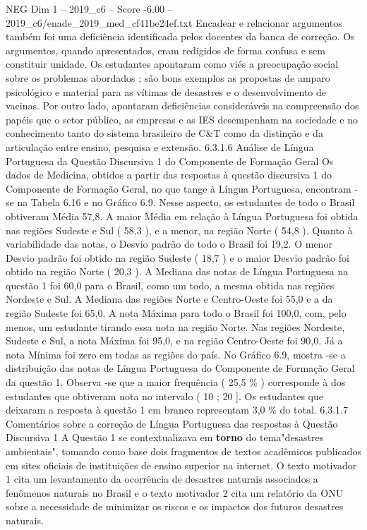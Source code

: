 \begin{textsample}{NEG Dim 1 – 2019\_c6 – Score -6.00 – 2019\_c6/enade\_2019\_med\_cf41be24ef.txt}
Encadear e relacionar argumentos também foi uma deficiência identificada pelos docentes da banca de correção.
Os argumentos, quando apresentados, eram redigidos de forma confusa e sem constituir unidade.
Os estudantes apontaram como viés a preocupação social sobre os problemas abordados ; são bons exemplos as propostas de amparo psicológico e material para as vítimas de desastres e o desenvolvimento de vacinas.
Por outro lado, apontaram deficiências consideráveis na compreensão dos papéis que o setor público, as empresas e as IES desempenham na sociedade e no conhecimento tanto do sistema brasileiro de C\&T como da distinção e da articulação entre ensino, pesquisa e extensão. 6.3.1.6 Análise de Língua Portuguesa da Questão Discursiva 1 do Componente de Formação Geral Os dados de Medicina, obtidos a partir das respostas à questão discursiva 1 do Componente de Formação Geral, no que tange à Língua Portuguesa, encontram -se na Tabela 6.16 e no Gráfico 6.9.
Nesse aspecto, os estudantes de todo o Brasil obtiveram Média 57,8.
A maior Média em relação à Língua Portuguesa foi obtida nas regiões Sudeste e Sul ( 58,3 ), e a menor, na região Norte ( 54,8 ).
Quanto à variabilidade das notas, o Desvio padrão de todo o Brasil foi 19,2.
O menor Desvio padrão foi obtido na região Sudeste ( 18,7 ) e o maior Desvio padrão foi obtido na região Norte ( 20,3 ).
A Mediana das notas de Língua Portuguesa na questão 1 foi 60,0 para o Brasil, como um todo, a mesma obtida nas regiões Nordeste e Sul.
A Mediana das regiões Norte e Centro-Oeste foi 55,0 e a da região Sudeste foi 65,0.
A nota Máxima para todo o Brasil foi 100,0, com, pelo menos, um estudante tirando essa nota na região Norte.
Nas regiões Nordeste, Sudeste e Sul, a nota Máxima foi 95,0, e na região Centro-Oeste foi 90,0.
Já a nota Mínima foi zero em todas as regiões do país.
No Gráfico 6.9, mostra -se a distribuição das notas de Língua Portuguesa do Componente de Formação Geral da questão 1.
Observa -se que a maior frequência ( 25,5 \% ) corresponde à dos estudantes que obtiveram nota no intervalo ( 10 ; 20 ].
Os estudantes que deixaram a resposta à questão 1 em branco representam 3,0 \% do total. 6.3.1.7 Comentários sobre a correção de Língua Portuguesa das respostas à Questão Discursiva 1 A Questão 1 se contextualizava em \textbf{torno} do tema"desastres ambientais", tomando como base dois fragmentos de textos acadêmicos publicados em sites oficiais de instituições de ensino superior na internet.
O texto motivador 1 cita um levantamento da ocorrência de desastres naturais associados a fenômenos naturais no Brasil e o texto motivador 2 cita um relatório da ONU sobre a necessidade de minimizar os riscos e os impactos dos futuros desastres naturais.

\end{textsample}
